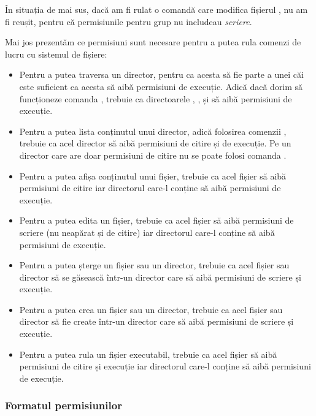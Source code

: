 În situația de mai sus, dacă am fi rulat o comandă care modifica fișierul
, nu am fi reușit, pentru că permisiunile pentru grup nu includeau
\textit{scriere}.

Mai jos prezentăm ce permisiuni sunt necesare pentru a putea rula comenzi de
lucru cu sistemul de fișiere:

\begin{itemize}
  \item Pentru a putea traversa un director, pentru ca acesta să fie parte
          a unei căi este suficient ca acesta să aibă permisiuni de
          execuție. Adică dacă dorim să funcționeze comanda , trebuie ca directoarele , ,  și  să aibă
          permisiuni de execuție.
  \item Pentru a putea lista conținutul unui director, adică folosirea
    comenzii , trebuie ca acel director să aibă permisiuni de
          citire și de execuție. Pe un director care are doar permisiuni
          de citire nu se poate folosi comanda .
  \item Pentru a putea afișa conținutul unui fișier, trebuie ca acel
          fișier să aibă permisiuni de citire iar directorul care-l
          conține să aibă permisiuni de execuție.
  \item Pentru a putea edita un fișier, trebuie ca acel fișier să aibă
          permisiuni de scriere (nu neapărat și de citire) iar directorul
          care-l conține să aibă permisiuni de execuție.
  \item Pentru a putea șterge un fișier sau un director, trebuie ca acel
          fișier sau director să se găsească într-un director care să aibă
          permisiuni de scriere și execuție.
  \item Pentru a putea crea un fișier sau un director, trebuie ca acel
          fișier sau director să fie create într-un director care să aibă
          permisiuni de scriere și execuție.
  \item Pentru a putea rula un fișier executabil, trebuie ca acel fișier
          să aibă permisiuni de citire și execuție iar directorul care-l
          conține să aibă permisiuni de execuție.
\end{itemize}

\subsubsection{Formatul permisiunilor}
\label{sec:user:perm-format}

